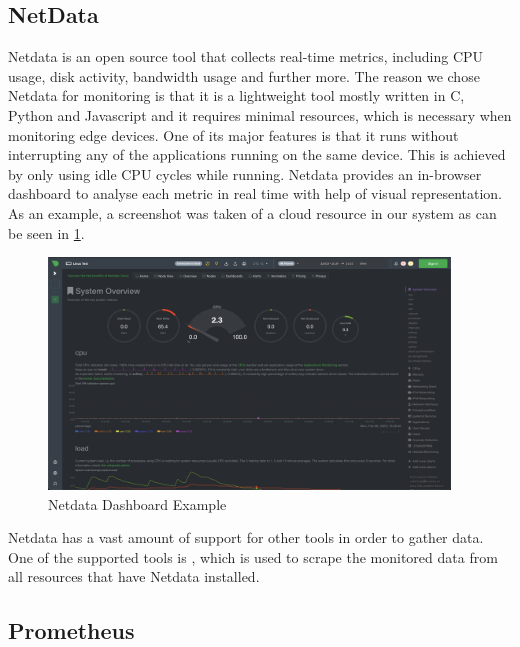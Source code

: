   \subsection{NetData}
  \label{sec:netdata-evaluation-setup}

    Netdata is an open source tool that collects real-time metrics, including CPU usage, disk activity, bandwidth usage and further more.
    The reason we chose Netdata for monitoring is that it is a lightweight tool mostly written in C, Python and Javascript and it requires minimal resources, which is necessary when monitoring edge devices.
    One of its major features is that it runs without interrupting any of the applications running on the same device. This is achieved by only using idle CPU cycles while running.
    Netdata provides an in-browser dashboard to analyse each metric in real time with help of visual representation. As an example, a screenshot was taken of a cloud resource in our system as can be seen in \ref{fig:netdata-dashboard}.
    \begin{figure}[h!]
        \centering
        \includegraphics[width=0.95\textwidth]{figures/netdata.png}
        \caption{Netdata Dashboard Example}
        \label{fig:netdata-dashboard}
    \end{figure}
    Netdata has a vast amount of support for other tools in order to gather data. 
    One of the supported tools is , which is used to scrape the monitored data from all resources that have Netdata installed.

  \subsection{Prometheus}
  \label{sec:prometheus-evaluation-setup}
  
